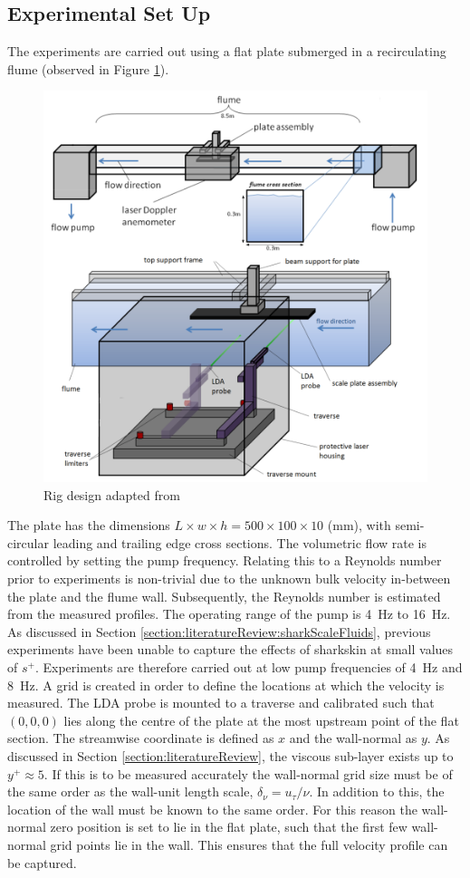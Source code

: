 \documentclass[12pt,oneside,a4paper]{article}
\begin{document}
\subsection{Experimental Set Up}
\label{section:experiments:setUp}
The experiments are carried out using a flat plate submerged in a recirculating flume (observed in Figure \ref{figure:experiments:setUp}).
%
\begin{figure}[!b]
\centering
\includegraphics[width = 12cm]{images/LDA_theoryImages/expSetUp.png}
\caption{Rig design adapted from \cite{fletcher2014phd}}
\label{figure:experiments:setUp}
\end{figure}
%
The plate has the dimensions $L \times w \times h = 500 \times 100 \times 10 $ (mm), with semi-circular leading and trailing edge cross sections. The volumetric flow rate is controlled by setting the pump frequency. Relating this to a Reynolds number prior to experiments is non-trivial due to the unknown bulk velocity in-between the plate and the flume wall. Subsequently, the Reynolds number is estimated from the measured profiles. The operating range of the pump is \SI{4}{Hz} to \SI{16}{Hz}. As discussed in Section \ref{section:literatureReview:sharkScaleFluids}, previous experiments have been unable to capture the effects of sharkskin at small values of $s^+$. Experiments are therefore carried out at low pump frequencies of \SI{4}{Hz} and \SI{8}{Hz}. A grid is created in order to define the locations at which the velocity is measured. The LDA probe is mounted to a traverse and calibrated such that $(0,0,0)$ lies along the centre of the plate at the most upstream point of the flat section. The streamwise coordinate is defined as $x$ and the wall-normal as $y$. As discussed in Section \ref{section:literatureReview}, the viscous sub-layer exists up to $y^+ \approx 5$. If this is to be measured accurately the wall-normal grid size must be of the same order as the wall-unit length scale, $\delta_\nu = u_\tau / \nu$. In addition to this, the location of the wall must be known to the same order. For this reason the wall-normal zero position is set to lie in the flat plate, such that the first few wall-normal grid points lie in the wall. This ensures that the full velocity profile can be captured.
\end{document}
